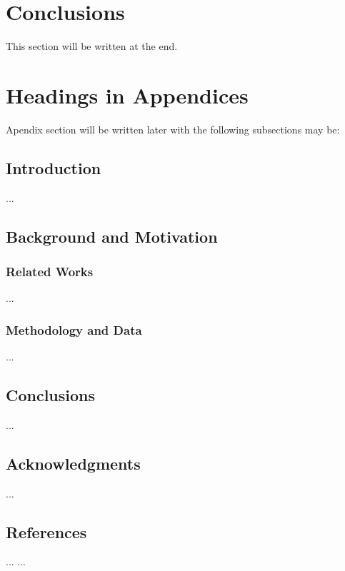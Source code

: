 \documentclass{acm_proc_article-sp}
\begin{document}
\section{Conclusions}
This section will be written at the end.


 
\appendix
\section{Headings in Appendices}
Apendix section will be written later with the following subsections may be:
\subsection{Introduction}
...
\subsection{Background and Motivation}
\subsubsection{Related Works}
...
\subsubsection{Methodology and Data}
...
\subsection{Conclusions}
...
\subsection{Acknowledgments}
...

\subsection{References}
... ...

\balancecolumns
\end{document}
